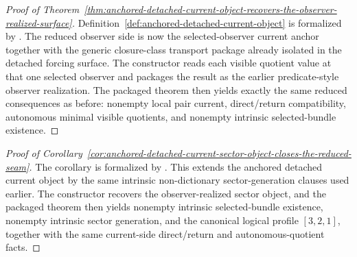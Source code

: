 \begin{proof}[Proof of Theorem~\ref{thm:anchored-detached-current-object-recovers-the-observer-realized-surface}]
\label{proof:thm:anchored-detached-current-object-recovers-the-observer-realized-surface}
Definition~\ref{def:anchored-detached-current-object} is formalized by
. The reduced observer side is now
the selected-observer current anchor together with the generic closure-class
transport package already isolated in the detached forcing surface. The
constructor
 reads each
visible quotient value at that one selected observer and packages the result as
the earlier predicate-style observer realization. The packaged theorem
 then yields exactly the
same reduced consequences as before: nonempty local pair current,
direct/return compatibility, autonomous minimal visible quotients, and
nonempty intrinsic selected-bundle existence.
\end{proof}

\begin{proof}[Proof of Corollary~\ref{cor:anchored-detached-current-sector-object-closes-the-reduced-seam}]
\label{proof:cor:anchored-detached-current-sector-object-closes-the-reduced-seam}
The corollary is formalized by
. This extends the anchored
detached current object by the same intrinsic non-dictionary sector-generation
clauses used earlier. The constructor
recovers the observer-realized sector object, and the packaged theorem
 then yields
nonempty intrinsic selected-bundle existence, nonempty intrinsic sector
generation, and the canonical logical profile \([3,2,1]\), together with the
same current-side direct/return and autonomous-quotient facts.
\end{proof}

